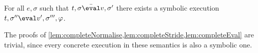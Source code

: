 \begin{lemma}
  \label{lem:completeEval}
  For all $e,\sigma$ such that $t,\sigma \bar{\eval}v,\sigma'$
  there exists a symbolic execution $t,\sigma''\eval v',\sigma''',\phi$.
\end{lemma}


The proofs of \cref{lem:completeNormalise,lem:completeStride,lem:completeEval} are trivial, since every concrete execution in these semantics is also a symbolic one.
